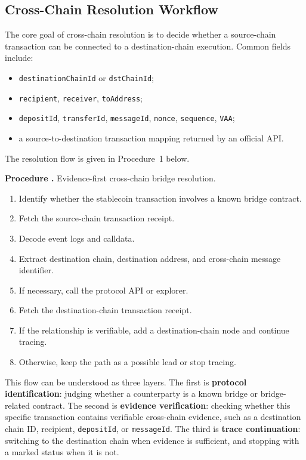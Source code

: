 \documentclass[12pt,a4paper]{article}
\newcounter{algctr}
\newenvironment{procedure}[1]{%
  \par\medskip\noindent\refstepcounter{algctr}%
  \textbf{Procedure \thealgctr.} #1\par\nopagebreak
  \begin{enumerate}\setlength{\itemsep}{0pt}}{%
  \end{enumerate}\medskip}
\begin{document}
\subsection{Cross-Chain Resolution Workflow}

The core goal of cross-chain resolution is to decide whether a source-chain transaction can be connected to a destination-chain execution. Common fields include:

\begin{itemize}
    \item \texttt{destinationChainId} or \texttt{dstChainId};
    \item \texttt{recipient}, \texttt{receiver}, \texttt{toAddress};
    \item \texttt{depositId}, \texttt{transferId}, \texttt{messageId}, \texttt{nonce}, \texttt{sequence}, \texttt{VAA};
    \item a source-to-destination transaction mapping returned by an official API.
\end{itemize}

The resolution flow is given in Procedure~1 below.

\begin{procedure}{Evidence-first cross-chain bridge resolution.}
\item Identify whether the stablecoin transaction involves a known bridge contract.
\item Fetch the source-chain transaction receipt.
\item Decode event logs and calldata.
\item Extract destination chain, destination address, and cross-chain message identifier.
\item If necessary, call the protocol API or explorer.
\item Fetch the destination-chain transaction receipt.
\item If the relationship is verifiable, add a destination-chain node and continue tracing.
\item Otherwise, keep the path as a possible lead or stop tracing.
\end{procedure}

This flow can be understood as three layers. The first is \textbf{protocol identification}: judging whether a counterparty is a known bridge or bridge-related contract. The second is \textbf{evidence verification}: checking whether this specific transaction contains verifiable cross-chain evidence, such as a destination chain ID, recipient, \texttt{depositId}, or \texttt{messageId}. The third is \textbf{trace continuation}: switching to the destination chain when evidence is sufficient, and stopping with a marked status when it is not.
\end{document}
